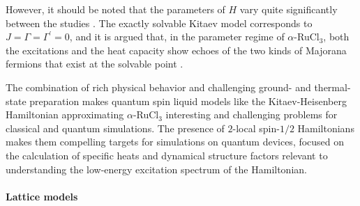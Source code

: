 However, it should be noted that the parameters of $H$ vary quite significantly between the studies \cite{winter2016challenges,maksimov2020rethinking}. The exactly solvable Kitaev model corresponds to $J=\Gamma=\Gamma^\prime=0$, and it is argued that, in the parameter regime of $\alpha$-RuCl$_3$, both the excitations and the heat capacity show echoes of the two kinds of Majorana fermions that exist at the solvable point \cite{gohlke2017dynamics,laurell2020dynamical}.

The combination of rich physical behavior and challenging ground- and thermal-state preparation makes quantum spin liquid models like the Kitaev-Heisenberg Hamiltonian approximating $\alpha$-RuCl$_3$ interesting and challenging problems for classical and quantum simulations. The presence of $2$-local spin-$1/2$ Hamiltonians makes them compelling targets for simulations on quantum devices, focused on the calculation of specific heats and dynamical structure factors relevant to understanding the low-energy excitation spectrum of the Hamiltonian.

\paragraph{Lattice models}

